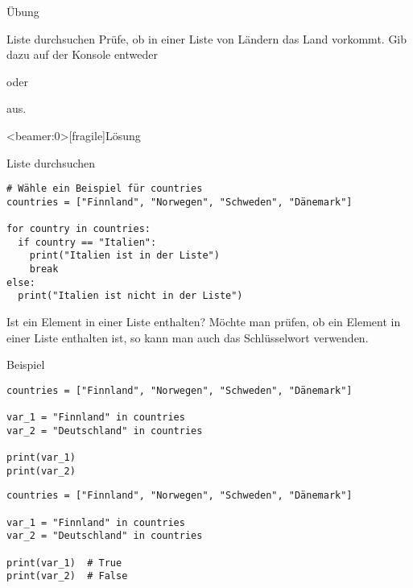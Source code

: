 \begin{frame}{Übung}

\begin{block}{Liste durchsuchen}
	\vspace{2pt}
Prüfe, ob in einer Liste von Ländern das Land  vorkommt. Gib dazu auf der Konsole entweder 


oder 


aus.  

\end{block}
\end{frame}


\begin{frame}<beamer:0>[fragile]{Lösung}
\begin{solutionblock}{Liste durchsuchen}
\begin{verbatim}
# Wähle ein Beispiel für countries
countries = ["Finnland", "Norwegen", "Schweden", "Dänemark"]

for country in countries:
  if country == "Italien":
    print("Italien ist in der Liste")
    break
else: 
  print("Italien ist nicht in der Liste")
\end{verbatim}
\end{solutionblock}
\end{frame}

\begin{fragile}

\begin{block}{Ist ein Element in einer Liste enthalten?}
\vspace{2pt}	
Möchte man prüfen, ob ein Element in einer Liste enthalten ist, so kann man auch das Schlüsselwort  verwenden. 
\end{block}

\pause 
\vspace{12pt}

\begin{exampleblock}{Beispiel}
\vspace{2pt}
\begin{overprint}
\begin{verbatim}
countries = ["Finnland", "Norwegen", "Schweden", "Dänemark"]

var_1 = "Finnland" in countries
var_2 = "Deutschland" in countries

print(var_1)  
print(var_2)
\end{verbatim}
\begin{verbatim}
countries = ["Finnland", "Norwegen", "Schweden", "Dänemark"]

var_1 = "Finnland" in countries
var_2 = "Deutschland" in countries

print(var_1)  # True
print(var_2)  # False
\end{verbatim}
\end{overprint}

\end{exampleblock}
\end{fragile}


